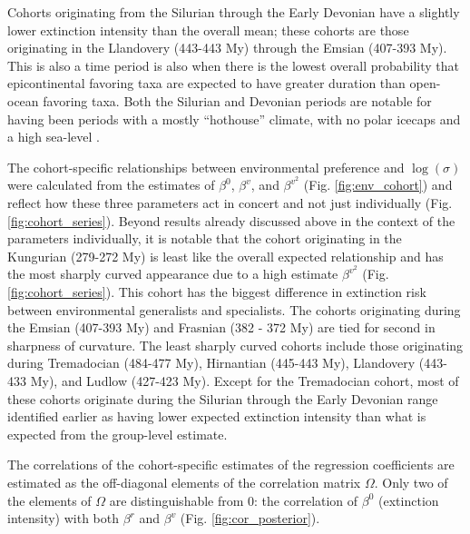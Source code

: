 \documentclass[11pt]{article}
\begin{document}
Cohorts originating from the Silurian through the Early Devonian have a slightly lower extinction intensity than the overall mean; these cohorts are those originating in the Llandovery (443-443 My) through the Emsian (407-393 My). This is also a time period is also when there is the lowest overall probability that epicontinental favoring taxa are expected to have greater duration than open-ocean favoring taxa. Both the Silurian and Devonian periods are notable for having been periods with a mostly ``hothouse'' climate, with no polar icecaps and a high sea-level \citep{Edwards1985,Joachimski2009,Munnecke2010}.

The cohort-specific relationships between environmental preference and \(\log(\sigma)\) were calculated from the estimates of \(\beta^{0}\), \(\beta^{v}\), and \(\beta^{v^{2}}\) (Fig. \ref{fig:env_cohort}) and reflect how these three parameters act in concert and not just individually (Fig. \ref{fig:cohort_series}). Beyond results already discussed above in the context of the parameters individually, it is notable that the cohort originating in the Kungurian (279-272 My) is least like the overall expected relationship and has the most sharply curved appearance due to a high estimate \(\beta^{v^{2}}\) (Fig. \ref{fig:cohort_series}). This cohort has the biggest difference in extinction risk between environmental generalists and specialists. The cohorts originating during the Emsian (407-393 My) and Frasnian (382 - 372 My) are tied for second in sharpness of curvature. The least sharply curved cohorts include those originating during Tremadocian (484-477 My), Hirnantian (445-443 My), Llandovery (443-433 My), and Ludlow (427-423 My). Except for the Tremadocian cohort, most of these cohorts originate during the Silurian through the Early Devonian range identified earlier as having lower expected extinction intensity than what is expected from the group-level estimate.

The correlations of the cohort-specific estimates of the regression coefficients are estimated as the off-diagonal elements of the correlation matrix \(\Omega\). Only two of the elements of \(\Omega\) are distinguishable from 0: the correlation of \(\beta^{0}\) (extinction intensity) with both \(\beta^{r}\) and \(\beta^{v}\) (Fig. \ref{fig:cor_posterior}). 
\end{document}
